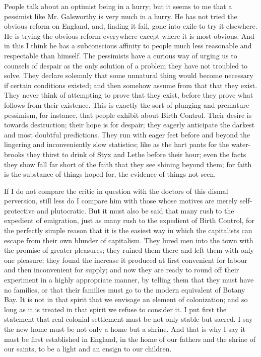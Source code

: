 \documentclass{book}
\begin{document}
People talk about an optimist being in a hurry; but it seems to me that a pessimist like Mr. Galsworthy is very much in a hurry. He has not tried the obvious reform on England, and, finding it fail, gone into exile to try it elsewhere. He is trying the obvious reform everywhere except where it is most obvious. And in this I think he has a subconscious affinity to people much less reasonable and respectable than himself. The pessimists have a curious way of urging us to counsels of despair as the only solution of a problem they have not troubled to solve. They declare solemnly that some unnatural thing would become necessary if certain conditions existed; and then somehow assume from that that they exist. They never think of attempting to prove that they exist, before they prove what follows from their existence. This is exactly the sort of plunging and premature pessimism, for instance, that people exhibit about Birth Control. Their desire is towards destruction; their hope is for despair; they eagerly anticipate the darkest and most doubtful predictions. They run with eager feet before and beyond the lingering and inconveniently slow statistics; like as the hart pants for the water-brooks they thirst to drink of Styx and Lethe before their hour; even the facts they show fall far short of the faith that they see shining beyond them; for faith is the substance of things hoped for, the evidence of things not seen.

If I do not compare the critic in question with the doctors of this dismal perversion, still less do I compare him with those whose motives are merely self-protective and plutocratic. But it must also be said that many rush to the expedient of emigration, just as many rush to the expedient of Birth Control, for the perfectly simple reason that it is the easiest way in which the capitalists can escape from their own blunder of capitalism. They lured men into the town with the promise of greater pleasures; they ruined them there and left them with only one pleasure; they found the increase it produced at first convenient for labour and then inconvenient for supply; and now they are ready to round off their experiment in a highly appropriate manner, by telling them that they must have no families, or that their families must go to the modern equivalent of Botany Bay. It is not in that spirit that we envisage an element of colonization; and so long as it is treated in that spirit we refuse to consider it. I put first the statement that real colonial settlement must be not only stable but sacred. I say the new home must be not only a home but a shrine. And that is why I say it must be first established in England, in the home of our fathers and the shrine of our saints, to be a light and an ensign to our children.
\end{document}
